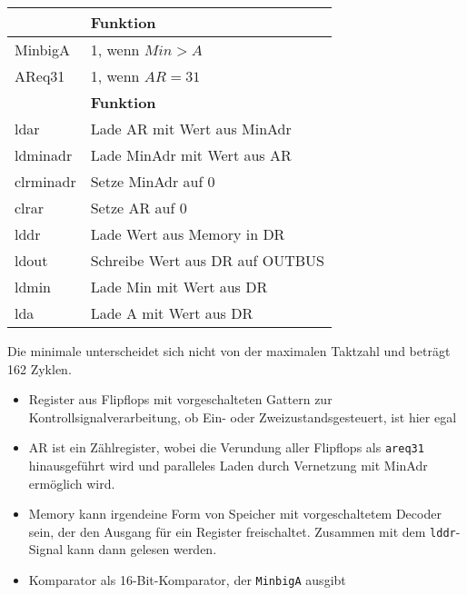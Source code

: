 \documentclass{CInf_practice}
\begin{document}
\begin{center}
   \begin{tabularx}{.8\textwidth}{|L|X|}
      \hline
       & \textbf{Funktion} \\ \hline
      MinbigA   & 1, wenn $Min > A$ \\
      AReq31    & 1, wenn $AR=31$ \\ \hline
      \hline
       & \textbf{Funktion} \\ \hline
      ldar                                  & Lade AR mit Wert aus MinAdr\\
      ldminadr                              & Lade MinAdr mit Wert aus AR\\
      clrminadr                             & Setze MinAdr auf 0\\
      clrar                                 & Setze AR auf 0\\
      lddr                                  & Lade Wert aus Memory in DR\\
      ldout                                 & Schreibe Wert aus DR auf OUTBUS\\
      ldmin                                 & Lade Min mit Wert aus DR\\
      lda                                   & Lade A mit Wert aus DR\\
      \hline
   \end{tabularx}
\end{center}



Die minimale unterscheidet sich nicht von der maximalen Taktzahl und beträgt 162
Zyklen.


\begin{itemize}
   \item Register aus Flipflops mit vorgeschalteten Gattern zur
      Kontrollsignalverarbeitung, ob Ein- oder Zweizustandsgesteuert, ist hier
      egal
   \item AR ist ein Zählregister, wobei die Verundung aller Flipflops als
      \texttt{areq31} hinausgeführt wird und paralleles Laden durch Vernetzung
      mit MinAdr ermöglich wird.
   \item Memory kann irgendeine Form von Speicher mit vorgeschaltetem Decoder
      sein, der den Ausgang für ein Register freischaltet. Zusammen mit dem
      \texttt{lddr}-Signal kann dann gelesen werden.
   \item Komparator als 16-Bit-Komparator, der \texttt{MinbigA} ausgibt
\end{itemize}
\end{document}
